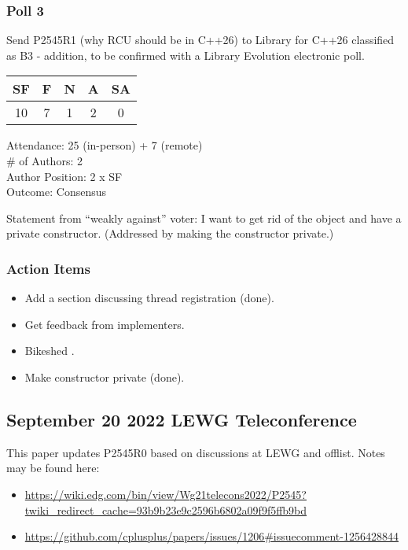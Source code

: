 \subsubsection{Poll 3}
\label{sec:kona2022:Poll 3}

Send P2545R1 (why RCU should be in C++26) to Library for C++26 classified as B3 - addition, to be confirmed with a Library Evolution electronic poll.

\begin{tabular}{c|c|c|c|c}
SF & F &  N & A & SA \\
\hline
10 & 7 &  1 & 2 &  0 \\
\end{tabular}

Attendance: 25 (in-person) + 7 (remote) \\
\# of Authors: 2 \\
Author Position: 2 x SF \\
Outcome: Consensus

Statement from ``weakly against'' voter: I want to get rid of the object
and have a private constructor.
(Addressed by making the constructor private.)

\subsubsection{Action Items}
\label{sec:kona2022:Action Items}

\begin{itemize}
\item	Add a section discussing thread registration (done).
\item	Get feedback from implementers.
\item	Bikeshed .
\item	Make  constructor private (done).
\end{itemize}

\subsection{September 20 2022 LEWG Teleconference}
\label{sec:September 20 2022 LEWG Teleconference}

This paper updates P2545R0 based on discussions at LEWG and offlist.
Notes may be found here:

\begin{itemize}
\item	\url{https://wiki.edg.com/bin/view/Wg21telecons2022/P2545?twiki_redirect_cache=93b9b23e9c2596b6802a09f9f5ffb9bd}
\item	\url{https://github.com/cplusplus/papers/issues/1206#issuecomment-1256428844}
\end{itemize}

